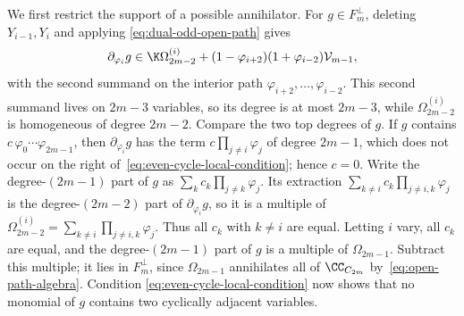 We first restrict the support of a possible annihilator.
For $g\in F_m^\perp$, deleting $Y_{i-1},Y_i$ and applying
\eqref{eq:dual-odd-open-path} gives
\begin{equation}\label{eq:even-cycle-local-condition}
\partial_{\varphi_i}g\in
\K\Omega_{2m-2}^{(i)}+
(1-\varphi_{i+2})(1+\varphi_{i-2})\mathcal V_{m-1},
\end{equation}
with the second summand on the interior path
$\varphi_{i+2},\ldots,\varphi_{i-2}$.
This second summand lives on $2m-3$ variables, so its degree is at most
$2m-3$, while $\Omega^{(i)}_{2m-2}$ is homogeneous of degree $2m-2$.
Compare the two top degrees of $g$. If $g$ contains
$c\,\varphi_0\cdots\varphi_{2m-1}$, then $\partial_{\varphi_i}g$ has the
term $c\prod_{j\ne i}\varphi_j$ of degree $2m-1$, which does not occur on
the right of~\eqref{eq:even-cycle-local-condition}; hence $c=0$. Write
the degree-$(2m-1)$ part of $g$ as $\sum_kc_k\prod_{j\ne k}\varphi_j$.
Its extraction $\sum_{k\ne i}c_k\prod_{j\ne i,k}\varphi_j$ is the
degree-$(2m-2)$ part of $\partial_{\varphi_i}g$, so it is a multiple of
$\Omega^{(i)}_{2m-2}=\sum_{k\ne i}\prod_{j\ne i,k}\varphi_j$. Thus all
$c_k$ with $k\ne i$ are equal. Letting $i$ vary, all $c_k$ are equal,
and the degree-$(2m-1)$ part of $g$ is a multiple of $\Omega_{2m-1}$.
Subtract this multiple; it lies in $F_m^\perp$, since $\Omega_{2m-1}$
annihilates all of $\CC_{C_{2m}}$ by~\eqref{eq:open-path-algebra}. Condition
\eqref{eq:even-cycle-local-condition} now shows that no monomial of $g$
contains two cyclically adjacent variables.

